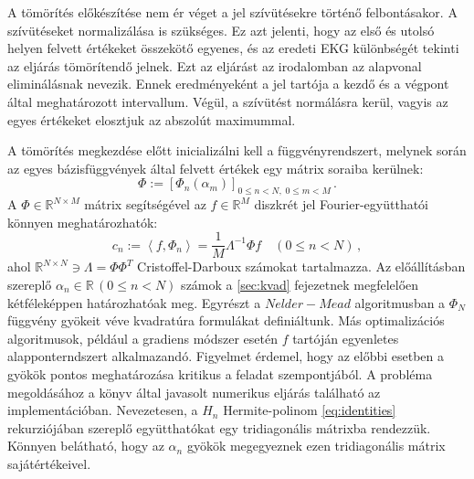 \documentclass[oneside,titlepage,12pt,a4paper]{report}
\begin{document}
A tömörítés előkészítése nem ér véget a jel szívütésekre történő felbontásakor. A szívütéseket normalizálása is szükséges. Ez azt jelenti, hogy az első és utolsó helyen felvett értékeket összekötő egyenes, és az eredeti EKG különbségét tekinti az eljárás tömörítendő jelnek. Ezt az eljárást az irodalomban az alapvonal eliminálásnak nevezik. Ennek eredményeként a jel tartója a kezdő és a végpont által meghatározott intervallum. Végül, a szívütést normálásra kerül, vagyis az egyes értékeket 
elosztjuk az abszolút maximummal. \par
	A tömörítés megkezdése előtt inicializálni kell a függvényrendszert, 
melynek során az egyes bázisfüggvények által felvett értékek egy mátrix soraiba kerülnek: 
\begin{equation*}
	\Phi:=\left[\Phi_n(\alpha_m)\right]_{0\leq n < N,\;0\leq m < M}\,.
	\label{eq:phi_matrix}
\end{equation*}
A $\Phi\in\mathbb{R}^{N\times M}$ mátrix segítségével az $f\in\mathbb{R}^M$ diszkrét jel Fourier-együtthatói könnyen meghatározhatók:
\begin{equation*}
	c_n:=\left\langle f, \Phi_n \right\rangle=\frac{1}{M} \Lambda^{-1} \Phi f \quad (0\leq n < N)\,,
	\label{eq:phi_coeffs}
\end{equation*}
ahol $\mathbb{R}^{N\times N}\ni\Lambda=\Phi \Phi^T$ Cristoffel-Darboux számokat tartalmazza. Az előállításban szereplő $\alpha_n\in\mathbb{R}\, (0\leq n < N)$ számok a \ref{sec:kvad} fejezetnek megfelelően kétféleképpen határozhatóak meg. Egyrészt a $Nelder-Mead$ algoritmusban a $\Phi_N$ függvény gyökeit véve kvadratúra formulákat definiáltunk. Más optimalizációs algoritmusok, például a gradiens módszer esetén $f$ tartóján egyenletes alapponterndszert alkalmazandó. Figyelmet érdemel, hogy az előbbi esetben a gyökök pontos meghatározása kritikus a feladat szempontjából. A probléma megoldásához a \cite{gautschi} könyv által javasolt numerikus eljárás található az implementációban. Nevezetesen, a $H_n$ Hermite-polinom \eqref{eq:identities} rekurziójában szereplő együtthatókat egy tridiagonális mátrixba rendezzük. Könnyen belátható, hogy az $\alpha_n$ gyökök megegyeznek ezen tridiagonális mátrix sajátértékeivel.  \par
\end{document}
